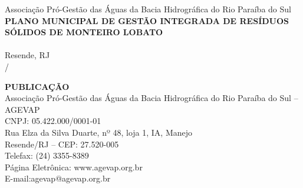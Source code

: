 \begin{center}
	\vspace{2em}
	Associação Pró-Gestão das Águas da Bacia Hidrográfica do Rio Paraíba do Sul\\
	\vspace{10cm}
	\textbf{{\Large PLANO MUNICIPAL DE GESTÃO INTEGRADA DE RESÍDUOS SÓLIDOS DE MONTEIRO LOBATO}\\}
	\vspace{2em}
	\textbf{{\Large \nomeProduto}}\\
	\vfill
	{\Large Resende, RJ\\
	\mes / \ano}
\end{center}

\pagebreak

\vspace*{\fill}%
\raggedright
{\textbf{PUBLICAÇÃO\\}
\vspace{2em}
Associação Pró-Gestão das Águas da Bacia Hidrográfica do Rio Paraíba do Sul – AGEVAP\\
CNPJ: 05.422.000/0001-01\\
Rua Elza da Silva Duarte, nº 48, loja 1, IA, Manejo\\
Resende/RJ – CEP: 27.520-005\\
Telefax: (24) 3355-8389\\
Página Eletrônica: www.agevap.org.br\\
E-mail:agevap@agevap.org.br}

\pagebreak

\clearpage